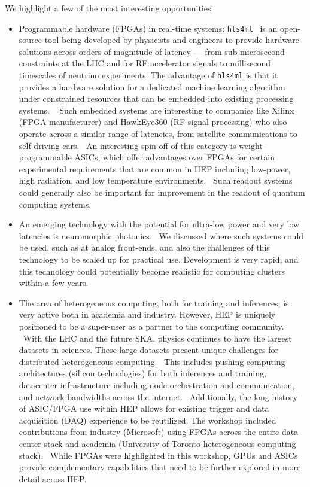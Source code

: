 \documentclass[11pt,letterpaper,fleqn]{article}
\begin{document}
We highlight a few of the most interesting opportunities:
\begin{itemize}
\item Programmable hardware (FPGAs) in real-time systems: \texttt{hls4ml}~\cite{hls4ml} is an open-source tool being developed by physicists and engineers to provide hardware solutions across orders of magnitude of latency --- from sub-microsecond constraints at the LHC and for RF accelerator signals to millisecond timescales of neutrino experiments. The advantage of \texttt{hls4ml} is that it provides a hardware solution for a dedicated machine learning algorithm under constrained resources that can be embedded into existing processing systems.   Such embedded systems are interesting to companies like Xilinx (FPGA manufacturer) and HawkEye360 (RF signal processing) who also operate across a similar range of latencies, from satellite communications to self-driving cars.  An interesting spin-off of this category is weight-programmable ASICs, which offer advantages over FPGAs for certain experimental requirements that are common in HEP including low-power, high radiation, and low temperature environments.  Such readout systems could generally also be important for improvement in the readout of quantum computing systems.

\item An emerging technology with the potential for ultra-low power and very low latencies is neuromorphic photonics.  We discussed where such systems could be used, such as at analog front-ends, and also the challenges of this technology to be scaled up for practical use. Development is very rapid, and this technology could potentially become realistic for computing clusters within a few years.

\item The area of heterogeneous computing, both for training and inferences, is very active both in academia and industry. However, HEP is uniquely positioned to be a super-user as a partner to the computing community.  With the LHC and the future SKA, physics continues to have the largest datasets in sciences. These large datasets present unique challenges for distributed heterogeneous computing.  This includes pushing computing architectures (silicon technologies) for both inferences and training, datacenter infrastructure including node orchestration and communication, and network bandwidths across the internet.  Additionally, the long history of ASIC/FPGA use within HEP allows for existing trigger and data acquisition (DAQ) experience to be reutilized. The workshop included contributions from industry (Microsoft) using FPGAs across the entire data center stack and academia (University of Toronto heterogeneous computing stack).  While FPGAs were highlighted in this workshop, GPUs and ASICs provide complementary capabilities that need to be further explored in more detail across HEP.
\end{itemize}
\end{document}
